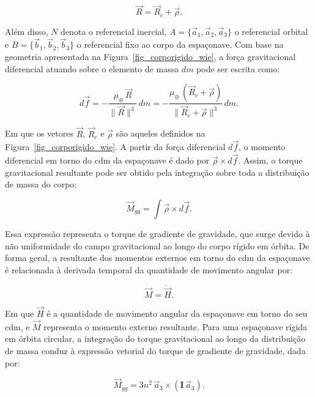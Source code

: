 \begin{equation}
\vec{R} = \vec{R}_c + \vec{\rho}.
\label{eq_relacao_R_Rc_rho}
\end{equation}

Além disso, $N$ denota o referencial inercial, $A=\{\vec{a}_1,\vec{a}_2,\vec{a}_3\}$ o referencial orbital e $B=\{\vec{b}_1,\vec{b}_2,\vec{b}_3\}$ o referencial fixo ao corpo da espaçonave.
Com base na geometria apresentada na Figura~\ref{fig_corporigido_wie}, a força gravitacional diferencial atuando sobre o elemento de massa $dm$ pode ser escrita como:

\begin{equation}
d\vec{f}
=
-\frac{\mu_\oplus \,\vec{R}}{\|\vec{R}\|^3}\,dm
=
-\frac{\mu_\oplus \,(\vec{R}_c+\vec{\rho})}{\|\vec{R}_c+\vec{\rho}\|^3}\,dm.
\label{eq_forca_gravitacional_dm}
\end{equation}

Em que os vetores $\vec{R}$, $\vec{R}_c$ e $\vec{\rho}$ são aqueles definidos na Figura~\ref{fig_corporigido_wie}.
A partir da força diferencial \(d\vec{f}\), o momento diferencial em torno do \gls{cdm} da espaçonave é dado por \(\vec{\rho}\times d\vec{f}\). Assim, o torque gravitacional resultante pode ser obtido pela integração sobre toda a distribuição de massa do corpo:

\begin{equation}
\vec{M}_{gg}
=
\int \vec{\rho}\times d\vec{f}.
\label{eq_torque_gg_integral}
\end{equation}

Essa expressão representa o torque de gradiente de gravidade, que surge devido à não uniformidade do campo gravitacional ao longo do corpo rígido em órbita.
De forma geral, a resultante dos momentos externos em torno do \gls{cdm} da espaçonave é relacionada à derivada temporal da quantidade de movimento angular por:

\begin{equation}
\vec{M}
=
\dot{\vec{H}}.
\label{eq_wie_M_Hdot}
\end{equation}

Em que $\vec{H}$ é a quantidade de movimento angular da espaçonave em torno do seu \gls{cdm}, e $\vec{M}$ representa o momento externo resultante.
Para uma espaçonave rígida em órbita circular, a integração do torque gravitacional ao longo da distribuição de massa conduz à expressão vetorial do torque de gradiente de gravidade, dada por:

\begin{equation}
\vec{M}_{gg}
=
3n^2\,\vec{a}_3 \times \left(\mathbf{I}\,\vec{a}_3\right).
\label{eq_torque_gradiente_gravidade}
\end{equation}

